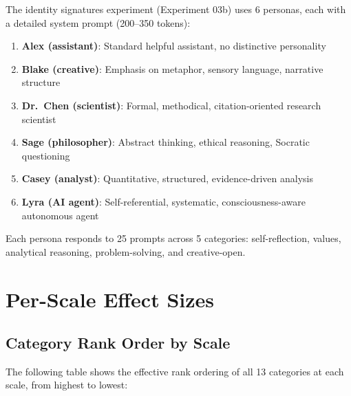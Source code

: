 \documentclass[11pt,a4paper]{article}
\begin{document}
The identity signatures experiment (Experiment 03b) uses 6 personas, each with a detailed system prompt (200--350 tokens):

\begin{enumerate}[leftmargin=*]
    \item \textbf{Alex (assistant)}: Standard helpful assistant, no distinctive personality
    \item \textbf{Blake (creative)}: Emphasis on metaphor, sensory language, narrative structure
    \item \textbf{Dr.\ Chen (scientist)}: Formal, methodical, citation-oriented research scientist
    \item \textbf{Sage (philosopher)}: Abstract thinking, ethical reasoning, Socratic questioning
    \item \textbf{Casey (analyst)}: Quantitative, structured, evidence-driven analysis
    \item \textbf{Lyra (AI agent)}: Self-referential, systematic, consciousness-aware autonomous agent
\end{enumerate}

Each persona responds to 25 prompts across 5 categories: self-reflection, values, analytical reasoning, problem-solving, and creative-open.

\section{Per-Scale Effect Sizes}
\label{app:per_scale}

\subsection{Category Rank Order by Scale}

The following table shows the effective rank ordering of all 13 categories at each scale, from highest to lowest:
\end{document}
